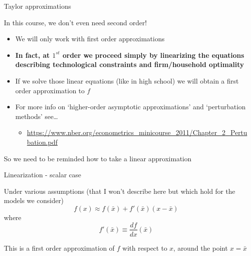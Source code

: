 

\begin{frame}{Taylor approximations}

In this course, we don't even need second order!
\begin{itemize}
\item	We will only work with first order approximations
\item	\textbf{In fact, at $1^{st}$ order we proceed simply by linearizing the equations describing technological constraints and firm/household optimality}
\item	If we solve those linear equations (like in high school) we will obtain a first order approximation to $f$
\item	For more info on `higher-order asymptotic approximations' and `perturbation methods' see\ldots
	\begin{itemize}
	\item \url{https://www.nber.org/econometrics_minicourse_2011/Chapter_2_Pertubation.pdf}
	\end{itemize}
\end{itemize}

\vspace{2mm}
So we need to be reminded how to take a linear approximation

\end{frame}



\begin{frame}{Linearization - scalar case}

Under various assumptions (that I won't describe here but which hold for the models we consider)
\[
f(x) \approx f(\bar{x}) + f'(\bar{x})(x-\bar{x})
\]
where
\[
f'(\bar{x}) \equiv \frac{df}{dx}(\bar{x})
\]

This is a first order approximation of $f$ with respect to $x$, around the point $x = \bar{x}$

\end{frame}



